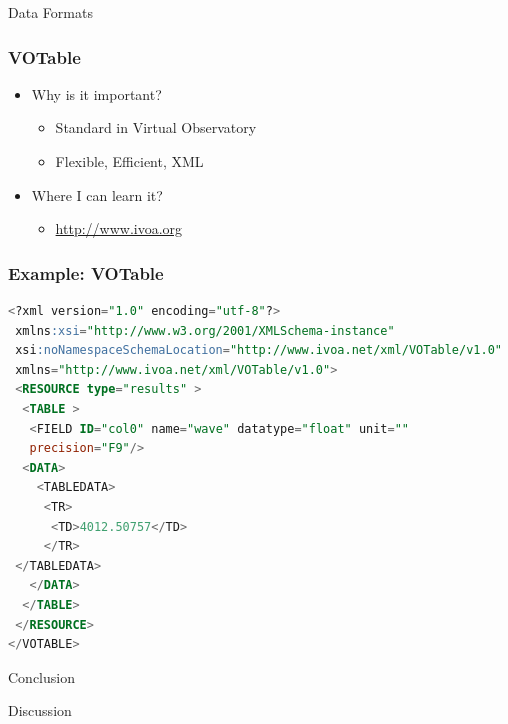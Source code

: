 \documentclass[fleqn]{beamer}
\begin{document}
\begin{section}{Data Formats}
  \begin{frame}\frametitle{VOTable}
  \begin{itemize}
    \item{Why is it important?}
      \begin{itemize}
      \item Standard in Virtual Observatory
      \item Flexible, Efficient, XML
      \end{itemize}
    \item{Where I can learn it?}
      \begin{itemize}
      \item \url{http://www.ivoa.org}
      \end{itemize}
  \end{itemize}
  \end{frame}

\begin{frame}[containsverbatim]\frametitle{Example: VOTable}
\begin{lstlisting}[language=SQL]
<?xml version="1.0" encoding="utf-8"?>
 xmlns:xsi="http://www.w3.org/2001/XMLSchema-instance"
 xsi:noNamespaceSchemaLocation="http://www.ivoa.net/xml/VOTable/v1.0"
 xmlns="http://www.ivoa.net/xml/VOTable/v1.0">
 <RESOURCE type="results" >
  <TABLE >
   <FIELD ID="col0" name="wave" datatype="float" unit=""
   precision="F9"/>
  <DATA>
    <TABLEDATA>
     <TR>
      <TD>4012.50757</TD>
     </TR>
 </TABLEDATA>
   </DATA>
  </TABLE>
 </RESOURCE>
</VOTABLE>
\end{lstlisting}
\end{frame}






\end{section}






\begin{section}{Conclusion}
\begin{frame}
  \begin{center}
 \huge Discussion   
  \end{center}
\end{frame}
\end{section}
\end{document}
